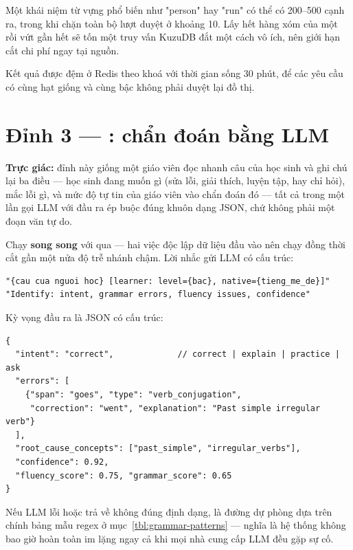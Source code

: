 \begin{luuy}
Một khái niệm từ vựng phổ biến như "person" hay "run" có thể có 200--500 cạnh ra, trong
khi  chặn toàn bộ lượt duyệt ở khoảng 10. Lấy hết hàng xóm của một
 rồi vứt gần hết sẽ tốn một truy vấn KuzuDB đắt một cách vô ích, nên giới
hạn  cắt chi phí ngay tại nguồn.
\end{luuy}

Kết quả được đệm ở Redis theo khoá
 với thời gian sống
30 phút, để các yêu cầu có cùng hạt giống và cùng bậc không phải duyệt lại đồ thị.

\section{Đỉnh 3 — : chẩn đoán bằng LLM}

\textbf{Trực giác:} đỉnh này giống một giáo viên đọc nhanh câu của học sinh và ghi chú lại
ba điều — học sinh đang muốn gì (sửa lỗi, giải thích, luyện tập, hay chỉ hỏi), mắc lỗi gì,
và mức độ tự tin của giáo viên vào chẩn đoán đó — tất cả trong một lần gọi LLM với đầu ra ép
buộc đúng khuôn dạng JSON, chứ không phải một đoạn văn tự do.

Chạy \textbf{song song} với  qua  — hai việc
độc lập dữ liệu đầu vào nên chạy đồng thời cắt gần một nửa độ trễ nhánh chậm. Lời nhắc gửi
LLM có cấu trúc:

\begin{lstlisting}
"{cau cua nguoi hoc} [learner: level={bac}, native={tieng_me_de}]"
"Identify: intent, grammar errors, fluency issues, confidence"
\end{lstlisting}

Kỳ vọng đầu ra là JSON có cấu trúc:

\begin{lstlisting}
{
  "intent": "correct",             // correct | explain | practice | ask
  "errors": [
    {"span": "goes", "type": "verb_conjugation",
     "correction": "went", "explanation": "Past simple irregular verb"}
  ],
  "root_cause_concepts": ["past_simple", "irregular_verbs"],
  "confidence": 0.92,
  "fluency_score": 0.75, "grammar_score": 0.65
}
\end{lstlisting}

Nếu LLM lỗi hoặc trả về không đúng định dạng,  là đường dự
phòng dựa trên chính bảng mẫu regex ở mục~\ref{tbl:grammar-patterns} — nghĩa là hệ thống
không bao giờ hoàn toàn im lặng ngay cả khi mọi nhà cung cấp LLM đều gặp sự cố.

